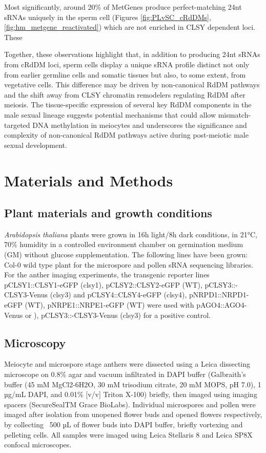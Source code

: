 Most significantly, around 20\% of MetGenes produce perfect-matching 24nt sRNAs uniquely in the sperm cell (Figures \ref{fig:PLvSC_cRdDMs}, \ref{fig:hm_metgene_reactivated}) which are not enriched in CLSY dependent loci. These 

Together, these observations highlight that, in addition to producing 24nt sRNAs from cRdDM loci, sperm cells display a unique sRNA profile  distinct not only from earlier germline cells and somatic tissues but also, to some extent, from vegetative cells.  This difference may be driven by non-canonical RdDM pathways and the shift away from CLSY chromatin remodelers regulating RdDM after meiosis. The tissue-specific expression of several key RdDM components in the male sexual lineage suggests potential mechanisms that could allow mismatch-targeted DNA methylation in meiocytes and underscores the significance and complexity of non-canonical RdDM pathways active during post-meiotic male sexual development.


\clearpage

\section{Materials and Methods}

\subsection{Plant materials and growth conditions}

\textit{Arabidopsis thaliana} plants were grown in 16h light/8h dark conditions, in 21°C, 70\% humidity in a controlled environment chamber on germination medium (GM) without glucose supplementation. The following lines have been grown: Col-0 wild type plant for the microspore and pollen sRNA sequencing libraries. For the anther imaging experiments, the transgenic reporter lines pCLSY1::CLSY1-eGFP (clsy1), pCLSY2::CLSY2-eGFP (WT), pCLSY3::-CLSY3-Venus (clsy3) and pCLSY4::CLSY4-eGFP (clsy4), pNRPD1::NRPD1-eGFP (WT), pNRPE1::NRPE1-eGFP (WT) were used with pAGO4::AGO4-Venus or ), pCLSY3::-CLSY3-Venus (clsy3) for a positive control.

\subsection{Microscopy}

Meiocyte and microspore stage anthers were dissected using a Leica dissecting microscope on 0.8\% agar and vacuum infiltrated in DAPI buffer (Galbraith’s buffer (45 mM MgCl2-6H2O, 30 mM trisodium citrate, 20 mM MOPS, pH 7.0), 1 µg/mL DAPI, and 0.01\% [v/v] Triton X-100) briefly, then imaged using imaging spacers (SecureSealTM Grace BioLabs). Individual microspores and pollen were imaged after isolation from unopened flower buds and opened flowers respectively, by collecting ~500 µL of flower buds into DAPI buffer, briefly vortexing and pelleting cells. All samples were imaged using Leica Stellaris 8 and Leica SP8X confocal microscopes.

